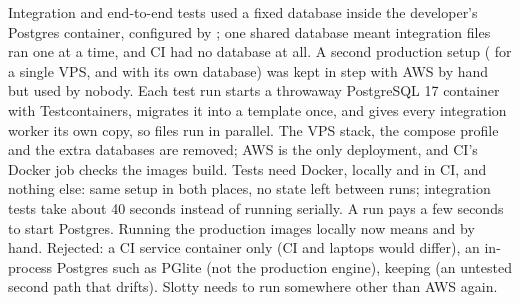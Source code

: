   {Integration and end-to-end tests used a fixed  database inside the
   developer's Postgres container, configured by ; one shared database meant
   integration files ran one at a time, and CI had no database at all. A second production setup
   ( for a single VPS, and  with its own 
   database) was kept in step with AWS by hand but used by nobody.}
  {Each test run starts a throwaway PostgreSQL 17 container with Testcontainers, migrates it into
   a template once, and gives every integration worker its own copy, so files run in parallel.
   The VPS stack, the  compose profile and the extra databases are removed; AWS is the
   only deployment, and CI's Docker job checks the images build.}
  {Tests need Docker, locally and in CI, and nothing else: same setup in both places, no state
   left between runs; integration tests take about 40 seconds instead of running serially. A run
   pays a few seconds to start Postgres. Running the production images locally now means
    and  by hand. Rejected: a CI service container only
   (CI and laptops would differ), an in-process Postgres such as PGlite (not the production engine),
   keeping  (an untested second path that drifts).}
  {Slotty needs to run somewhere other than AWS again.}

